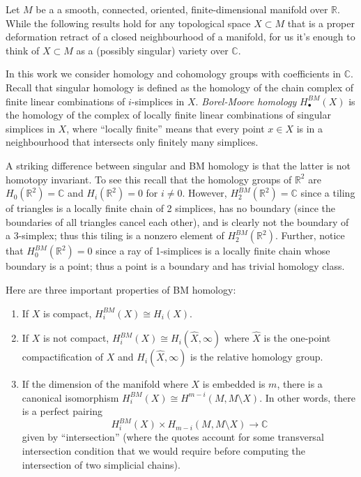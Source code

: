 \medskip\noindent
Let $M$ be a a smooth, connected,
oriented, finite-dimensional manifold over
$\mathbb{R}$.
While the following results hold for any
topological space $X \subset M$
that is a proper deformation retract
of a closed neighbourhood of a manifold,
for us it's enough to think of $X \subset M$
as a
(possibly singular) variety over
$\mathbb{C}$.

In this work we consider homology and
cohomology
groups with coefficients in $\mathbb{C}$.
Recall that singular homology is defined
as the homology of the chain complex of
finite linear combinations of $i$-simplices
in $X$.
\textit{Borel-Moore homology}
$H_\bullet^{BM}(X)$
is the homology of the complex of locally
finite
linear combinations of singular simplices in
$X$,
where ``locally finite'' means that every
point $x \in X$ is in a neighbourhood
that intersects only finitely many
simplices.

A striking
difference between singular and BM homology
is that the latter is not homotopy invariant.
To see this recall that the homology groups
of  $\mathbb{R}^2$ are
$H_0(\mathbb{R}^2)=\mathbb{C}$
and $H_i(\mathbb{R}^2)=0$ for $i \neq 0$.
However, $H_2^{BM}(\mathbb{R}^2)=\mathbb{C}$
since a tiling of triangles
is a locally finite chain of 2 simplices,
has no boundary (since the boundaries of
all triangles cancel each other),
and is clearly not the boundary of a
3-simplex;
thus this tiling is a nonzero element of
$H_2^{BM}(\mathbb{R}^2)$.
Further, notice that
$H_0^{BM}(\mathbb{R}^2)=0$
since a ray of 1-simplices
is a locally finite chain
whose boundary is a point;
thus a point is a boundary and
has trivial homology class.

\medskip\noindent
Here are three important properties of BM
homology:
\begin{enumerate}
\item If $X$ is compact, $H_i^{BM}(X)\cong
H_i(X)$.
\item If $X$ is not compact,
$H_i^{BM}(X)\cong H_i(\hat{X},\infty)$
where $\hat{X}$ is the one-point
compactification of $X$ and
$H_i(\hat{X},\infty)$ is the
relative homology group.
\item
\label{item-isomorphism-relative-cohomology}
If the dimension of the manifold
where $X$ is embedded is $m$,
there is a canonical isomorphism
$H_i^{BM}(X) \cong H^{m-i}(M,M\setminus X)$.
In other words, there is a perfect
pairing
$$
H_i^{BM}(X) \times H_{m-i}(M,M\setminus
X)\to \mathbb{C}
$$
given by ``intersection''
(where the quotes account for some
transversal intersection condition
that we would require before
computing the intersection of
two simplicial chains).
\end{enumerate}

